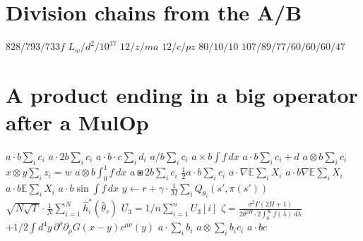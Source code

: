 \documentclass{article}
\begin{document}
\section{Division chains from the A/B}
$828/793/733 f$
$L_w/d^2/10^{37}$
$12/z/ma$
$12/c/pz$
$80/10/10$ $107/89/77/60/60/60/47$
\section{A product ending in a big operator after a MulOp}
$a\cdot b\sum_i c_i$ $a\cdot 2b\sum_i c_i$ $a\cdot b\cdot c\sum_i d_i$ $a/b\sum_i c_i$ $a\times b\int f\,dx$ $a\cdot b\sum_i c_i+d$
$a\otimes b\sum_i c_i$ $x\otimes y\sum_i z_i=w$ $a\otimes b\int_0^1 f\,dx$ $a\boxast 2b\sum_i c_i$ $\frac12 a\cdot b\sum_i c_i$
$a\cdot\nabla\mathbb{E}\sum_i X_i$ $a\cdot b\nabla\mathbb{E}\sum_i X_i$ $a\cdot b\mathbb{E}\sum_i X_i$ $a\cdot b\sin\int f\,dx$
$y\leftarrow r+\gamma\cdot\frac{1}{M}\sum_{i}Q_{\theta_{i}}(s',\pi(s'))$ $\sqrt{N\sqrt{T}}\cdot\frac{1}{N}\sum_{i=1}^{N}\widehat{h}_{i}^{*}(\widehat{\theta}_{\tau})$
$\bar{U_{3}}=1/n\sum^{n}_{i=1}U_{3}[i]$ $\zeta=\frac{\sigma^{2}\Gamma(2H+1)}{2\theta^{2H}\cdot 2\int_{0}^{\infty}f(\lambda)\,d\lambda}$
$+1/2\int d^{4}y\,\partial^{\rho}\partial_{\rho}G(x-y)c^{\mu\nu}(y)$
$a\cdot\sum_i b_i$ $a\otimes\sum_i b_i c_i$ $a\cdot b c$
\end{document}
